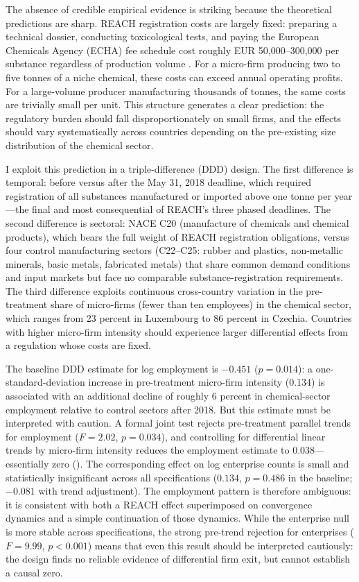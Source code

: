 \documentclass[12pt]{article}
\begin{document}
The absence of credible empirical evidence is striking because the theoretical predictions are sharp. REACH registration costs are largely fixed: preparing a technical dossier, conducting toxicological tests, and paying the European Chemicals Agency (ECHA) fee schedule cost roughly EUR 50,000--300,000 per substance regardless of production volume \citep{echa2018}. For a micro-firm producing two to five tonnes of a niche chemical, these costs can exceed annual operating profits. For a large-volume producer manufacturing thousands of tonnes, the same costs are trivially small per unit. This structure generates a clear prediction: the regulatory burden should fall disproportionately on small firms, and the effects should vary systematically across countries depending on the pre-existing size distribution of the chemical sector.

I exploit this prediction in a triple-difference (DDD) design. The first difference is temporal: before versus after the May 31, 2018 deadline, which required registration of all substances manufactured or imported above one tonne per year---the final and most consequential of REACH's three phased deadlines. The second difference is sectoral: NACE C20 (manufacture of chemicals and chemical products), which bears the full weight of REACH registration obligations, versus four control manufacturing sectors (C22--C25: rubber and plastics, non-metallic minerals, basic metals, fabricated metals) that share common demand conditions and input markets but face no comparable substance-registration requirements. The third difference exploits continuous cross-country variation in the pre-treatment share of micro-firms (fewer than ten employees) in the chemical sector, which ranges from 23 percent in Luxembourg to 86 percent in Czechia. Countries with higher micro-firm intensity should experience larger differential effects from a regulation whose costs are fixed.

The baseline DDD estimate for log employment is $-0.451$ ($p = 0.014$): a one-standard-deviation increase in pre-treatment micro-firm intensity (0.134) is associated with an additional decline of roughly 6 percent in chemical-sector employment relative to control sectors after 2018. But this estimate must be interpreted with caution. A formal joint test rejects pre-treatment parallel trends for employment ($F = 2.02$, $p = 0.034$), and controlling for differential linear trends by micro-firm intensity reduces the employment estimate to $0.038$---essentially zero (). The corresponding effect on log enterprise counts is small and statistically insignificant across all specifications ($0.134$, $p = 0.486$ in the baseline; $-0.081$ with trend adjustment). The employment pattern is therefore ambiguous: it is consistent with both a REACH effect superimposed on convergence dynamics and a simple continuation of those dynamics. While the enterprise null is more stable across specifications, the strong pre-trend rejection for enterprises ($F = 9.99$, $p < 0.001$) means that even this result should be interpreted cautiously: the design finds no reliable evidence of differential firm exit, but cannot establish a causal zero.
\end{document}
